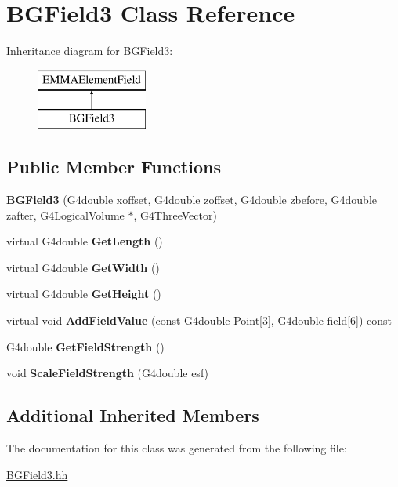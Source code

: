 \hypertarget{classBGField3}{\section{B\-G\-Field3 Class Reference}
\label{classBGField3}
}
Inheritance diagram for B\-G\-Field3\-:\begin{figure}[H]
\begin{center}
\leavevmode
\includegraphics[height=2.000000cm]{classBGField3}
\end{center}
\end{figure}
\subsection*{Public Member Functions}
\begin{DoxyCompactItemize}
\item 
\hypertarget{classBGField3_af114b557b150290f35c94127763d7bab}{{\bfseries B\-G\-Field3} (G4double xoffset, G4double zoffset, G4double zbefore, G4double zafter, G4\-Logical\-Volume $\ast$, G4\-Three\-Vector)}\label{classBGField3_af114b557b150290f35c94127763d7bab}

\item 
\hypertarget{classBGField3_ae49dd0f301f73bae6fae3d2672823cf8}{virtual G4double {\bfseries Get\-Length} ()}\label{classBGField3_ae49dd0f301f73bae6fae3d2672823cf8}

\item 
\hypertarget{classBGField3_a84aaf81a6f511ca8d726c94d52f30336}{virtual G4double {\bfseries Get\-Width} ()}\label{classBGField3_a84aaf81a6f511ca8d726c94d52f30336}

\item 
\hypertarget{classBGField3_a9a3274bc5f550093663680da846ba954}{virtual G4double {\bfseries Get\-Height} ()}\label{classBGField3_a9a3274bc5f550093663680da846ba954}

\item 
\hypertarget{classBGField3_a994e1d640acab76909cc82abbd7a8c42}{virtual void {\bfseries Add\-Field\-Value} (const G4double Point\mbox{[}3\mbox{]}, G4double field\mbox{[}6\mbox{]}) const }\label{classBGField3_a994e1d640acab76909cc82abbd7a8c42}

\item 
\hypertarget{classBGField3_a15e84284be2eae47e39d5c793cefae77}{G4double {\bfseries Get\-Field\-Strength} ()}\label{classBGField3_a15e84284be2eae47e39d5c793cefae77}

\item 
\hypertarget{classBGField3_a5941caec9fb72a08a67d9ccd2ff6c00c}{void {\bfseries Scale\-Field\-Strength} (G4double esf)}\label{classBGField3_a5941caec9fb72a08a67d9ccd2ff6c00c}

\end{DoxyCompactItemize}
\subsection*{Additional Inherited Members}


The documentation for this class was generated from the following file\-:\begin{DoxyCompactItemize}
\item 
\hyperlink{BGField3_8hh}{B\-G\-Field3.\-hh}\end{DoxyCompactItemize}
